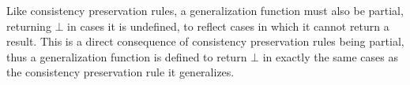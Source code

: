 
Like consistency preservation rules, a generalization function must also be partial, returning $\bot$ in cases it is undefined, to reflect cases in which it cannot return a result.
This is a direct consequence of consistency preservation rules being partial, thus a generalization function is defined to return $\bot$ in exactly the same cases as the consistency preservation rule it generalizes.

